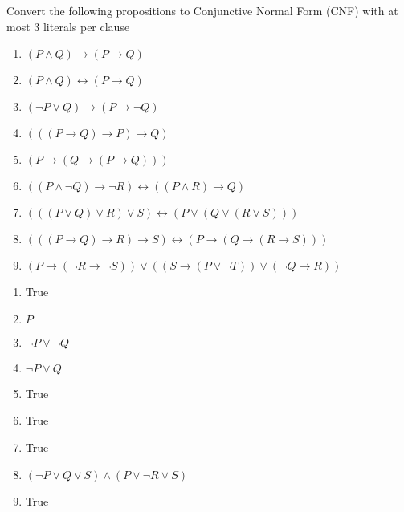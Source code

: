 \documentclass[12pt]{article}
\newenvironment{solution}[2][Solution]{ \begin{trivlist}
\item[\hskip \labelsep {\bfseries #1}]}{\end{trivlist}}
\newenvironment{problem}[2][Problem]{\begin{trivlist}
\item[\hskip \labelsep {\bfseries #1}\hskip \labelsep {\bfseries #2.}]}{\end{trivlist}}
\begin{document}
\vskip 0.5in
\pagebreak
\begin{problem}{6}Convert the following propositions to Conjunctive Normal Form (CNF) with at most 3 literals per clause
\begin{enumerate}
  \parskip=0in
  \parsep=0in
  \itemsep=0in
\item $(P \wedge Q) \rightarrow (P \rightarrow Q)$
\item $(P \wedge Q) \leftrightarrow (P \rightarrow Q)$
\item $(\lnot P \vee Q) \rightarrow (P \rightarrow \lnot Q)$
\item $(((P \rightarrow Q) \rightarrow P) \rightarrow Q)$
\item $(P \rightarrow (Q \rightarrow (P \rightarrow Q)))$
\item $((P \wedge \lnot Q) \rightarrow \lnot R) \leftrightarrow ((P \wedge R) \rightarrow Q)$
\item $(((P \vee Q) \vee R) \vee S) \leftrightarrow (P \vee (Q \vee (R \vee S)))$
\item $(((P \rightarrow Q) \rightarrow R) \rightarrow S) \leftrightarrow (P \rightarrow (Q \rightarrow (R \rightarrow S)))$
\item $(P \rightarrow (\lnot R \rightarrow \lnot S)) \vee ((S \rightarrow (P \vee \lnot T)) \vee (\lnot Q \rightarrow R))$
\end{enumerate}
\end{problem}
\begin{solution}{6}
\item[]
\begin{enumerate}
  \parskip=0in
  \parsep=0in
  \itemsep=0in
\item True
\item $P$
\item $\lnot P \vee \lnot Q$
\item $\lnot P \vee Q$
\item True
\item True
\item True
\item $(\lnot P \vee Q \vee S) \wedge (P \vee \lnot R \vee S)$
\item True
\end{enumerate}
\end{solution}
\end{document}
